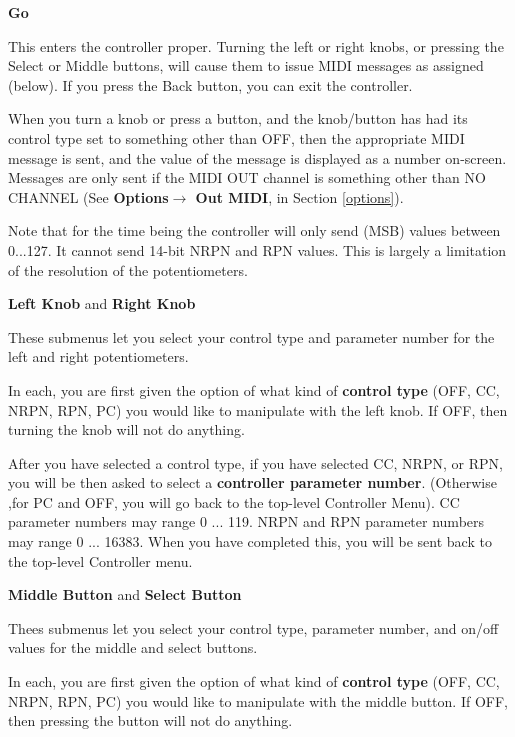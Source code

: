 \documentclass{article}
\begin{document}
	\begin{description}

	\item{\bf Go}
	
	This enters the controller proper.  Turning the left or right knobs, or pressing the Select or Middle buttons, will cause them to issue MIDI messages as assigned (below).  If you press the Back button, you can exit the controller.
	
	When you turn a knob or press a button, and the knob/button has had its control type set to something other than OFF, then the appropriate MIDI message is sent, and the value of the message is displayed as a number on-screen.  Messages are only sent if the MIDI OUT channel is something other than NO CHANNEL (See {\bf Options\(\boldsymbol\rightarrow\) Out MIDI}, in Section \ref{options}).
	
	Note that for the time being the controller will only send (MSB) values between 0...127.  It cannot send 14-bit NRPN and RPN values.  This is largely a limitation of the resolution of the potentiometers.

	\item{\bf Left Knob} and {\bf Right Knob}
	
	These submenus let you select your control type and parameter number for the left and right potentiometers.
	
	In each, you are first given the option of what kind of {\bf control type} (OFF, CC, NRPN, RPN, PC) you would like to manipulate with the left knob.  If OFF, then turning the knob will not do anything.

	After you have selected a control type, if you have selected CC, NRPN, or RPN, you will be then asked to select a {\bf controller parameter number}.  (Otherwise ,for PC and OFF, you will go back to the top-level Controller Menu).  CC parameter numbers may range 0 ... 119.  NRPN and RPN parameter numbers may range 0 ... 16383. When you have completed this, you will be sent back to the top-level Controller menu.

	\item{\bf Middle Button} and {\bf Select Button}
	
	Thees submenus let you select your control type, parameter number, and on/off values for the middle and select buttons.
	
	In each, you are first given the option of what kind of {\bf control type} (OFF, CC, NRPN, RPN, PC) you would like to manipulate with the middle button.  If OFF, then pressing the button will not do anything.


\end{description}
\end{document}
